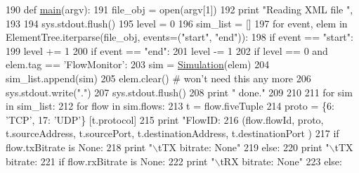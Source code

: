 \begin{DoxyCode}
190 \textcolor{keyword}{def }\hyperlink{namespaceflowmon-parse-results_a5d1c01dbc9b4217383d9b577f790496a}{main}(argv):
191     file\_obj = open(argv[1])
192     \textcolor{keywordflow}{print} \textcolor{stringliteral}{"Reading XML file "},
193  
194     sys.stdout.flush()        
195     level = 0
196     sim\_list = []
197     \textcolor{keywordflow}{for} event, elem \textcolor{keywordflow}{in} ElementTree.iterparse(file\_obj, events=(\textcolor{stringliteral}{"start"}, \textcolor{stringliteral}{"end"})):
198         \textcolor{keywordflow}{if} event == \textcolor{stringliteral}{"start"}:
199             level += 1
200         \textcolor{keywordflow}{if} event == \textcolor{stringliteral}{"end"}:
201             level -= 1
202             \textcolor{keywordflow}{if} level == 0 \textcolor{keywordflow}{and} elem.tag == \textcolor{stringliteral}{'FlowMonitor'}:
203                 sim = \hyperlink{classflowmon-parse-results_1_1Simulation}{Simulation}(elem)
204                 sim\_list.append(sim)
205                 elem.clear() \textcolor{comment}{# won't need this any more}
206                 sys.stdout.write(\textcolor{stringliteral}{"."})
207                 sys.stdout.flush()
208     \textcolor{keywordflow}{print} \textcolor{stringliteral}{" done."}
209 
210 
211     \textcolor{keywordflow}{for} sim \textcolor{keywordflow}{in} sim\_list:
212         \textcolor{keywordflow}{for} flow \textcolor{keywordflow}{in} sim.flows:
213             t = flow.fiveTuple
214             proto = \{6: \textcolor{stringliteral}{'TCP'}, 17: \textcolor{stringliteral}{'UDP'}\} [t.protocol]
215             \textcolor{keywordflow}{print} \textcolor{stringliteral}{"FlowID: %
216                 (flow.flowId, proto, t.sourceAddress, t.sourcePort, t.destinationAddress, t.destinationPort
      )
217             \textcolor{keywordflow}{if} flow.txBitrate \textcolor{keywordflow}{is} \textcolor{keywordtype}{None}:
218                 \textcolor{keywordflow}{print} \textcolor{stringliteral}{"\(\backslash\)tTX bitrate: None"}
219             \textcolor{keywordflow}{else}:
220                 \textcolor{keywordflow}{print} \textcolor{stringliteral}{"\(\backslash\)tTX bitrate: %
221             \textcolor{keywordflow}{if} flow.rxBitrate \textcolor{keywordflow}{is} \textcolor{keywordtype}{None}:
222                 \textcolor{keywordflow}{print} \textcolor{stringliteral}{"\(\backslash\)tRX bitrate: None"}
223             \textcolor{keywordflow}{else}:
}}
\end{DoxyCode}
